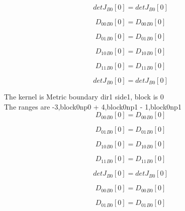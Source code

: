 \documentclass{article}
\begin{document}
\begin{dmath}{detJ{_{B0}}}[{0}] = {detJ{_{B0}}}[{0}]\end{dmath}

\begin{dmath}{D_{00}{_{B0}}}[{0}] = {D_{00}{_{B0}}}[{0}]\end{dmath}

\begin{dmath}{D_{01}{_{B0}}}[{0}] = {D_{01}{_{B0}}}[{0}]\end{dmath}

\begin{dmath}{D_{10}{_{B0}}}[{0}] = {D_{10}{_{B0}}}[{0}]\end{dmath}

\begin{dmath}{D_{11}{_{B0}}}[{0}] = {D_{11}{_{B0}}}[{0}]\end{dmath}

\begin{dmath}{detJ{_{B0}}}[{0}] = {detJ{_{B0}}}[{0}]\end{dmath}

\noindent The kernel is Metric boundary dir1 side1, block is 0\\\noindent The ranges are -3,block0np0 + 4,block0np1 - 1,block0np1\\\begin{dmath}{D_{00}{_{B0}}}[{0}] = {D_{00}{_{B0}}}[{0}]\end{dmath}

\begin{dmath}{D_{01}{_{B0}}}[{0}] = {D_{01}{_{B0}}}[{0}]\end{dmath}

\begin{dmath}{D_{10}{_{B0}}}[{0}] = {D_{10}{_{B0}}}[{0}]\end{dmath}

\begin{dmath}{D_{11}{_{B0}}}[{0}] = {D_{11}{_{B0}}}[{0}]\end{dmath}

\begin{dmath}{detJ{_{B0}}}[{0}] = {detJ{_{B0}}}[{0}]\end{dmath}

\begin{dmath}{D_{00}{_{B0}}}[{0}] = {D_{00}{_{B0}}}[{0}]\end{dmath}

\begin{dmath}{D_{01}{_{B0}}}[{0}] = {D_{01}{_{B0}}}[{0}]\end{dmath}
\end{document}
